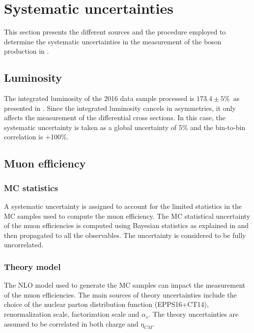 \section{Systematic uncertainties}\label{sec:WBoson_Systematics}

This section presents the different sources and the procedure employed to determine the systematic uncertainties in the measurement of the \W boson production in \pPb.

\subsection{Luminosity}

The integrated luminosity of the 2016 \pPb data sample processed is $173.4 \pm 5\%$~\nbinv as presented in . Since the integrated luminosity cancels in asymmetries, it only affects the measurement of the \WToMuNu differential cross sections. In this case, the systematic uncertainty is taken as a global uncertainty of 5$\%$ and the bin-to-bin correlation is +100$\%$.

\subsection{Muon efficiency}

\subsubsection{MC statistics}

A systematic uncertainty is assigned to account for the limited statistics in the MC samples used to compute the muon efficiency. The MC statistical uncertainty of the muon efficiencies is computed using Bayesian statistics as explained in  and then propagated to all the observables. The uncertainty is considered to be fully uncorrelated.

\subsubsection{Theory model}

The NLO model used to generate the MC samples can impact the measurement of the muon efficiencies. The main sources of theory uncertainties include the choice of the nuclear parton distribution function (EPPS16+CT14), renormalization scale, factorization scale and $\alpha_{s}$. The theory uncertainties are assumed to be correlated in both charge and $\eta_{CM}$.

